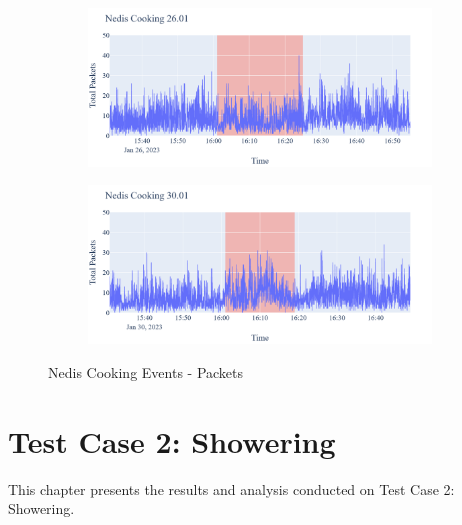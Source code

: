 \begin{figure}[H]
    \begin{subfigure}[b]{0.47\textwidth}
        \centering
        \includegraphics[width=1.2\hsize]{figures/Nedis_Cooking_Packets_26.01.png}
    \end{subfigure}
    \hspace{0.6cm}
    \begin{subfigure}[b]{0.47\textwidth}
        \centering
        \includegraphics[width=1.2\hsize]{figures/Nedis_Cooking_Packets_30.01.png}
    \end{subfigure}
    \caption{Nedis Cooking Events - Packets}
    \label{fig:NedisCookingPackets}
\end{figure}
\section{Test Case 2: Showering}
This chapter presents the results and analysis conducted on Test Case 2: Showering. 

